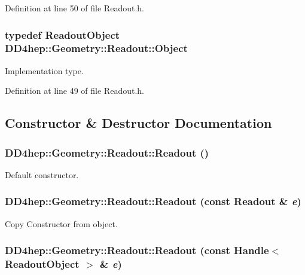 Definition at line 50 of file Readout.h.\hypertarget{class_d_d4hep_1_1_geometry_1_1_readout_ae25c79e6b7a94df1de7b1a2cf6df7ae4}{
\subsubsection[{Object}]{\setlength{\rightskip}{0pt plus 5cm}typedef {\bf ReadoutObject} {\bf DD4hep::Geometry::Readout::Object}}}
\label{class_d_d4hep_1_1_geometry_1_1_readout_ae25c79e6b7a94df1de7b1a2cf6df7ae4}


Implementation type. 

Definition at line 49 of file Readout.h.

\subsection{Constructor \& Destructor Documentation}
\hypertarget{class_d_d4hep_1_1_geometry_1_1_readout_a68a973b03f937589ab389eaaaa240087}{
\subsubsection[{Readout}]{\setlength{\rightskip}{0pt plus 5cm}DD4hep::Geometry::Readout::Readout ()}}
\label{class_d_d4hep_1_1_geometry_1_1_readout_a68a973b03f937589ab389eaaaa240087}


Default constructor. \hypertarget{class_d_d4hep_1_1_geometry_1_1_readout_a9c1a44f924f5a70eca44627569f56d21}{
\subsubsection[{Readout}]{\setlength{\rightskip}{0pt plus 5cm}DD4hep::Geometry::Readout::Readout (const {\bf Readout} \& {\em e})}}
\label{class_d_d4hep_1_1_geometry_1_1_readout_a9c1a44f924f5a70eca44627569f56d21}


Copy Constructor from object. \hypertarget{class_d_d4hep_1_1_geometry_1_1_readout_a6bfb91ac432f9ee6ed1b08921188a87a}{
\subsubsection[{Readout}]{\setlength{\rightskip}{0pt plus 5cm}DD4hep::Geometry::Readout::Readout (const {\bf Handle}$<$ {\bf ReadoutObject} $>$ \& {\em e})}}
\label{class_d_d4hep_1_1_geometry_1_1_readout_a6bfb91ac432f9ee6ed1b08921188a87a}


